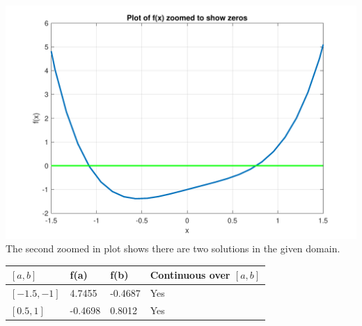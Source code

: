 \documentclass[a4paper,11pt]{article}
\begin{document}
\begin{enumerate}
\begin{enumerate}
{			\includegraphics[scale=0.5]{images/Q1a_i_zoomed.pdf}
		}
			The second zoomed in plot shows there are two solutions in the 
			given 
			domain.
			\begin{center}
				\begin{tabular}{l|lll}
					$[a,b]$     & f(a)    & f(b)    & Continuous over $[a,b]$ 
					\\ \hline
					$[-1.5,-1]$ & 4.7455  & -0.4687 & Yes                     
					\\
					$[0.5,1]$   & -0.4698 & 0.8012  & Yes                    
				\end{tabular}
			\end{center}
			

\end{enumerate}
\end{enumerate}
\end{document}
